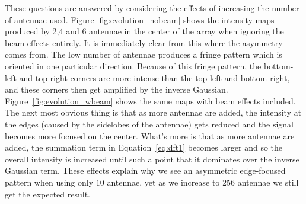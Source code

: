 \documentclass[11pt,letterpaper]{article}
\begin{document}
These questions are answered by considering the effects of increasing the number of antennae used. Figure \ref{fig:evolution_nobeam} shows the intensity maps produced by $2$,$4$ and $6$ antennae in the center of the array when ignoring the beam effects entirely. It is immediately clear from this where the asymmetry comes from. The low number of antennae produces a fringe pattern which is oriented in one particular direction. Because of this fringe pattern, the bottom-left and top-right corners are more intense than the top-left and bottom-right, and these corners then get amplified by the inverse Gaussian. Figure~\ref{fig:evolution_wbeam} shows the same maps with beam effects included. The next most obvious thing is that as more antennae are added, the intensity at the edges (caused by the sidelobes of the antennae) gets reduced and the signal becomes more focused on the center. What's more is that as more antennae are added, the summation term in Equation~\ref{eq:dft1} becomes larger and so the overall intensity is increased until such a point that it dominates over the inverse Gaussian term. These effects explain why we see an asymmetric edge-focused pattern when using only $10$ antennae, yet as we increase to $256$ antennae we still get the expected result.
\end{document}
